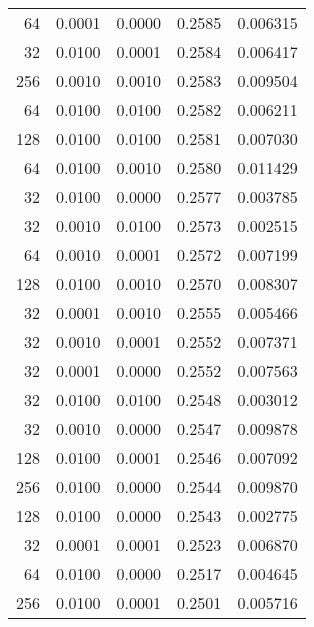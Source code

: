 \begin{tabular}{rrrrr}
  64 &  0.0001 &  0.0000 &  0.2585 &  0.006315 \\
  32 &  0.0100 &  0.0001 &  0.2584 &  0.006417 \\
 256 &  0.0010 &  0.0010 &  0.2583 &  0.009504 \\
  64 &  0.0100 &  0.0100 &  0.2582 &  0.006211 \\
 128 &  0.0100 &  0.0100 &  0.2581 &  0.007030 \\
  64 &  0.0100 &  0.0010 &  0.2580 &  0.011429 \\
  32 &  0.0100 &  0.0000 &  0.2577 &  0.003785 \\
  32 &  0.0010 &  0.0100 &  0.2573 &  0.002515 \\
  64 &  0.0010 &  0.0001 &  0.2572 &  0.007199 \\
 128 &  0.0100 &  0.0010 &  0.2570 &  0.008307 \\
  32 &  0.0001 &  0.0010 &  0.2555 &  0.005466 \\
  32 &  0.0010 &  0.0001 &  0.2552 &  0.007371 \\
  32 &  0.0001 &  0.0000 &  0.2552 &  0.007563 \\
  32 &  0.0100 &  0.0100 &  0.2548 &  0.003012 \\
  32 &  0.0010 &  0.0000 &  0.2547 &  0.009878 \\
 128 &  0.0100 &  0.0001 &  0.2546 &  0.007092 \\
 256 &  0.0100 &  0.0000 &  0.2544 &  0.009870 \\
 128 &  0.0100 &  0.0000 &  0.2543 &  0.002775 \\
  32 &  0.0001 &  0.0001 &  0.2523 &  0.006870 \\
  64 &  0.0100 &  0.0000 &  0.2517 &  0.004645 \\
 256 &  0.0100 &  0.0001 &  0.2501 &  0.005716 \\
\bottomrule
\end{tabular}
